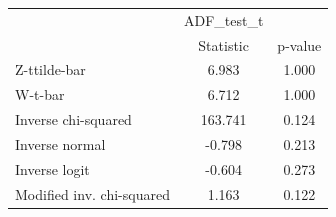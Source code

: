 \begin{tabular}{l*{2}{c}}
\hline\hline
            &  ADF\_test\_t&            \\
            &   Statistic&     p-value\\
\hline
Z-ttilde-bar&       6.983&       1.000\\
W-t-bar     &       6.712&       1.000\\
Inverse chi-squared&     163.741&       0.124\\
Inverse normal&      -0.798&       0.213\\
Inverse logit&      -0.604&       0.273\\
Modified inv. chi-squared&       1.163&       0.122\\
\hline\hline
\end{tabular}
